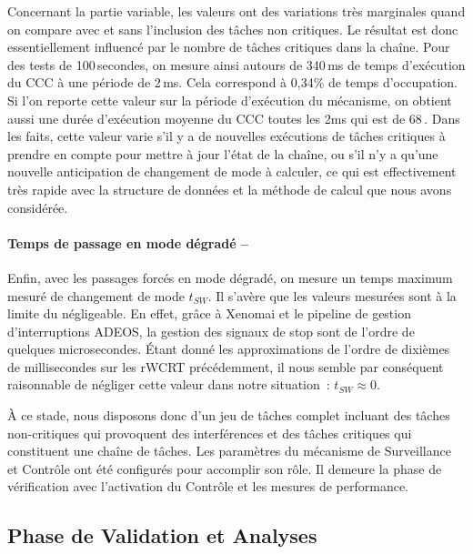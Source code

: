 \documentclass[french, a4paper, 11pt, twoside, pdftex]{StyleThese}
\begin{document}
Concernant la partie variable, les valeurs ont des variations très marginales quand on compare avec et sans l'inclusion des tâches non critiques. Le résultat est donc essentiellement influencé par le nombre de tâches critiques dans la chaîne. Pour des tests de 100\,secondes, on mesure ainsi autours de 340\,ms de temps d'exécution du CCC à une période de 2\,ms. Cela correspond à 0,34\% de temps d'occupation. Si l'on reporte cette valeur sur la période d'exécution du mécanisme, on obtient aussi une durée d'exécution moyenne du CCC toutes les 2ms qui est de 68\,. Dans les faits, cette valeur varie s'il y a de nouvelles exécutions de tâches critiques à prendre en compte pour mettre à jour l'état de la chaîne, ou s'il n'y a qu'une nouvelle anticipation de changement de mode à calculer, ce qui est effectivement très rapide avec la structure de données et la méthode de calcul que nous avons considérée.

\paragraph{Temps de passage en mode dégradé -- }Enfin, avec les passages forcés en mode dégradé, on mesure un temps maximum mesuré de changement de mode $t_{SW}$. Il s'avère que les valeurs mesurées sont à la limite du négligeable. En effet, grâce à Xenomai et le pipeline de gestion d'interruptions ADEOS, la gestion des signaux de stop sont de l'ordre de quelques microsecondes. Étant donné les approximations de l'ordre de dixièmes de millisecondes sur les rWCRT précédemment, il nous semble par conséquent raisonnable de négliger cette valeur dans notre situation~: $t_{SW} \approx 0$. 

À ce stade, nous disposons donc d'un jeu de tâches complet incluant des tâches non-critiques qui provoquent des interférences et des tâches critiques qui constituent une chaîne de tâches. Les paramètres du mécanisme de Surveillance et Contrôle ont été configurés pour accomplir son rôle. Il demeure la phase de vérification avec l'activation du Contrôle et les mesures de performance. 



\subsection{Phase de Validation et Analyses}
\end{document}
